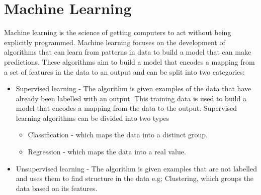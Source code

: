 \section{Machine Learning}
	Machine learning is the science of getting computers to act without being explicitly programmed\cite{machineLearning}. Machine learning focuses on the development of algorithms that can learn from patterns in data to build a model that can make predictions. These algorithms aim to build a model that encodes a mapping from a set of features in the data to an output and can be split into two categories: 
	
	\begin{itemize}
		\item Supervised learning - The algorithm is given examples of the data that have already been labelled with an output. This training data is used to build a model that encodes a mapping from the data to the output. Supervised learning algorithms can be divided into two types
			\begin{itemize}
				\item Classification - which maps the data into a distinct group.
				\item Regression - which maps the data into a real value.			
			\end{itemize}
		\item Unsupervised learning - The algorithm is given examples that are not labelled and uses them to find structure in the data e.g; Clustering, which groups the data based on its features.
	\end{itemize}